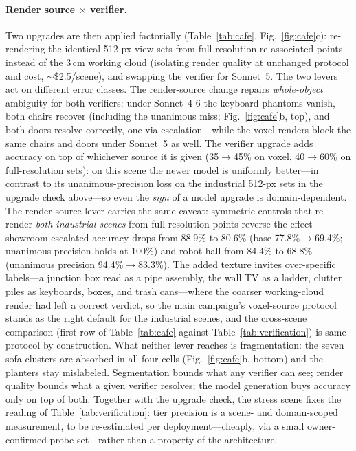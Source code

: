 \paragraph{Render source $\times$ verifier.}
Two upgrades are then applied factorially (Table~\ref{tab:cafe},
Fig.~\ref{fig:cafe}c): re-rendering the identical 512-px view sets
from full-resolution re-associated points instead of the 3\,cm working
cloud (isolating render quality at unchanged protocol and cost,
$\sim$\$2.5/scene), and swapping the verifier for Sonnet~5. The two
levers act on different error classes. The render-source change
repairs \emph{whole-object} ambiguity for both verifiers: under
Sonnet~4-6 the keyboard phantoms vanish, both chairs recover
(including the unanimous miss; Fig.~\ref{fig:cafe}b, top), and both
doors resolve correctly, one via escalation---while the voxel renders
block the same chairs and doors under Sonnet~5 as well. The verifier
upgrade adds accuracy on top of whichever source it is given
(35$\rightarrow$45\% on voxel, 40$\rightarrow$60\% on full-resolution
sets): on this scene the newer model is uniformly better---in contrast
to its unanimous-precision loss on the industrial 512-px sets in the
upgrade check above---so even the \emph{sign} of a model upgrade is
domain-dependent. The render-source lever carries the same caveat: symmetric controls
that re-render \emph{both industrial scenes} from full-resolution
points reverse the effect---showroom escalated accuracy drops from
88.9\% to 80.6\% (base 77.8\%$\rightarrow$69.4\%; unanimous precision
holds at 100\%) and robot-hall from 84.4\% to 68.8\% (unanimous
precision 94.4\%$\rightarrow$83.3\%). The added texture invites
over-specific labels---a junction box read as a pipe assembly, the
wall TV as a ladder, clutter piles as keyboards, boxes, and trash
cans---where the coarser working-cloud render had left a correct
verdict, so the main campaign's voxel-source protocol stands as the
right default for the industrial scenes, and the cross-scene
comparison (first row of Table~\ref{tab:cafe} against
Table~\ref{tab:verification}) is same-protocol by construction. What
neither lever reaches is fragmentation: the seven sofa clusters are
absorbed in all four cells (Fig.~\ref{fig:cafe}b, bottom) and the
planters stay mislabeled.
Segmentation bounds what any verifier can see; render quality bounds
what a given verifier resolves; the model generation buys accuracy
only on top of both. Together with the upgrade check, the stress scene
fixes the reading of Table~\ref{tab:verification}: tier precision is a
scene- and domain-scoped measurement, to be re-estimated per
deployment---cheaply, via a small owner-confirmed probe set---rather
than a property of the architecture.

